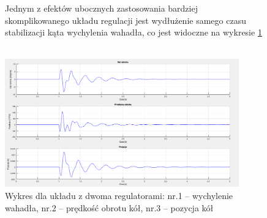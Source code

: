 \begin{figure}[h!]
    Jednym z efektów ubocznych zastosowania bardziej skomplikowanego układu regulacji jest wydłużenie samego czasu stabilizacji kąta wychylenia wahadła, co jest widoczne na wykresie \ref{Wykresy PID2}
    \\ \\ 
    \begin{center}
        \includegraphics[width=0.9\textwidth]{Rysunki/Rozdzial02/Podwojny_PID_wykresy.png}
	    \caption{Wykres dla układu z dwoma regulatorami: nr.1 -- wychylenie wahadła, nr.2 -- prędkość obrotu kół, nr.3 -- pozycja kół}
    \end{center}
	\label{Wykresy PID2}
\end{figure}